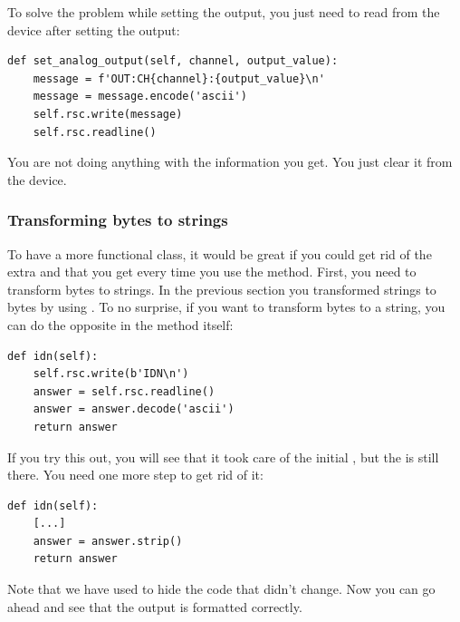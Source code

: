 To solve the problem while setting the output, you just need to read from the device after setting the output:

\begin{verbatim}
def set_analog_output(self, channel, output_value):
    message = f'OUT:CH{channel}:{output_value}\n'
    message = message.encode('ascii')
    self.rsc.write(message)
    self.rsc.readline()
\end{verbatim}

You are not doing anything with the information you get. You just clear it from the device.

\subsubsection{Transforming bytes to strings}
To have a more functional class, it would be great if you could get rid of the extra  and \py{\n} that you get every time you use the  method. First, you need to transform bytes to strings. In the previous section you transformed strings to bytes by using . To no surprise, if you want to transform bytes to a string, you can do the opposite in the  method itself:

\begin{verbatim}
def idn(self):
    self.rsc.write(b'IDN\n')
    answer = self.rsc.readline()
    answer = answer.decode('ascii')
    return answer
\end{verbatim}

If you try this out, you will see that it took care of the initial , but the \py{\n} is still there. You need one more step to get rid of it:

\begin{verbatim}
def idn(self):
    [...]
    answer = answer.strip()
    return answer
\end{verbatim}

Note that we have used %
\py{[...]} to hide the code that didn't change. Now you can go ahead and see that the output is formatted correctly.


